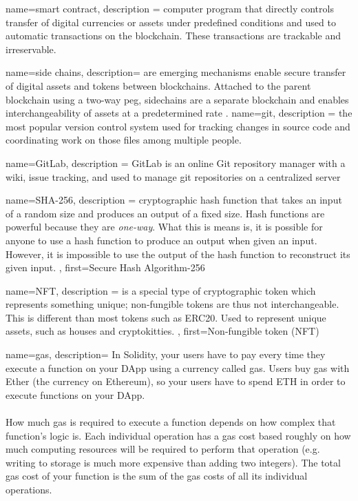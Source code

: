 {
	name={smart contract},
	description ={
		computer program that directly controls transfer of digital currencies or assets under predefined conditions and used to automatic transactions on the blockchain. These transactions are trackable and irreservable.
	}
}

{
	name={side chains},
	description= {
	are emerging mechanisms enable secure transfer of digital assets and tokens between blockchains. Attached to the parent blockchain using a two-way peg, sidechains are a separate blockchain and enables interchangeability of assets at a predetermined rate \cite{sideChains:Online}. 
	}
}
{
	name={git},
	description ={
			the most popular version control system used for tracking changes in source code and coordinating work on those files among multiple people.
	}
}


{
	name={GitLab},
	description ={
		GitLab is an online Git repository manager with a wiki, issue tracking, and used to manage \gls{git} repositories on a centralized server
	}
}

{
	name={SHA-256},
	description ={
		cryptographic hash function that takes an input of a random size and produces an output of a fixed size. Hash functions are powerful because they are \textit{one-way}. What this is means is, it is possible for anyone to use a hash function to produce an output when given an input. However, it is impossible to use the output of the hash function to reconstruct its given input.
	},
	first={Secure Hash Algorithm-256}
}


{
	name={NFT},
	description ={
		is a special type of cryptographic token which represents something unique; non-fungible tokens are thus not interchangeable. This is different than most tokens such as ERC20. Used to represent unique assets, such as houses and cryptokitties.
	},
	first={Non-fungible token (NFT)}
}

{
	name={gas},
	description={
	In Solidity, your users have to pay every time they execute a function on your DApp using a currency called gas. Users buy gas with Ether (the currency on Ethereum), so your users have to spend ETH in order to execute functions on your DApp. \\ \\ How much gas is required to execute a function depends on how complex that function's logic is. Each individual operation has a gas cost based roughly on how much computing resources will be required to perform that operation (e.g. writing to storage is much more expensive than adding two integers). The total gas cost of your function is the sum of the gas costs of all its individual operations.
	}
}

